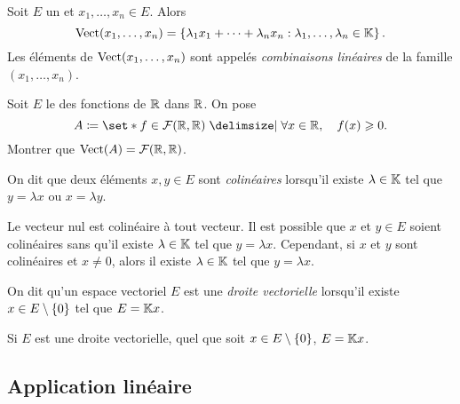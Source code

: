 \documentclass{magnolia}
\begin{document}
\begin{proposition}[utile=-2]
Soit $E$ un \Kev et $x_1,\ldots,x_n\in E$. Alors
\[\vect(x_1,\ldots,x_n)=\ensim{\lambda_1 x_1+\cdots+\lambda_n x_n}%
  {\lambda_1,\ldots,\lambda_n\in\K}.\]
Les éléments de $\operatorname{Vect}(x_1,\ldots,x_n)$ sont appelés \emph{combinaisons linéaires}
de la famille $(x_1,\ldots,x_n)$.
\end{proposition}


\begin{exoUnique}
\exo Soit $E$ le \Rev des fonctions de $\mathbb{R}$ dans $\mathbb{R}$. On pose
  \[A\defeq\enstq{f\in\mathcal{F}(\R,\R)}{\forall x\in\R \qsep f(x)\geq 0}.\]
	Montrer que $\operatorname{Vect}(A)=\mathcal{F}(\mathbb{R},\mathbb{R})$.
\end{exoUnique}

\begin{definition}
  On dit que deux éléments $x,y\in E$ sont \emph{colinéaires} lorsqu'il existe
  $\lambda\in\mathbb{K}$ tel que $y=\lambda x$ ou $x=\lambda y$.
\end{definition}

\begin{remarques}
\remarque Le vecteur nul est colinéaire à tout vecteur.
\remarque Il est possible que
  $x$ et $y\in E$ soient colinéaires sans qu'il existe $\lambda\in\mathbb{K}$ tel que $y=\lambda x$.
  Cependant, si $x$ et $y$ sont colinéaires et $x\neq 0$, alors il existe $\lambda\in\mathbb{K}$
  tel que $y=\lambda x$.
\end{remarques}

\begin{definition}
On dit qu'un espace vectoriel $E$ est une \emph{droite vectorielle} lorsqu'il
 existe $x\in E\setminus\left\{0\right\}$ tel que $E=\mathbb{K} x$.
\end{definition}

\begin{remarqueUnique}
\remarque Si $E$ est une droite vectorielle, quel que soit $x\in E\setminus\left\{0\right\}$,
  $E=\mathbb{K} x$.
\end{remarqueUnique}


\subsection{Application linéaire}
\end{document}

